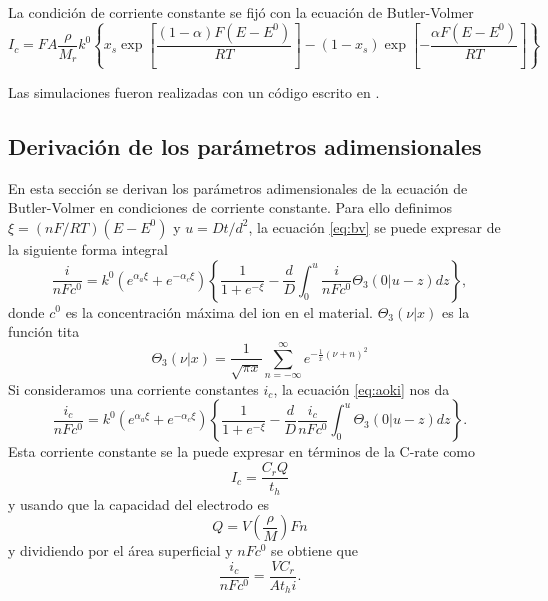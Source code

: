 La condición de corriente constante se fijó con la ecuación de Butler-Volmer
\begin{equation}\label{eq:bv}
    I_c = F A \frac{\rho}{M_r} k^0 \left\{x_s \exp\left[ \frac{(1-\alpha)F(E-E^0)}{RT} \right] - (1 - x_s) \exp\left[ -\frac{\alpha F (E-E^0)}{RT} \right] \right\}
\end{equation}

Las simulaciones fueron realizadas con un código escrito en .


\subsection{Derivación de los parámetros adimensionales}\label{s:derivparam}

En esta sección se derivan los parámetros adimensionales de la ecuación de
Butler-Volmer en condiciones de corriente constante. Para ello definimos
$\xi = (nF/RT)(E - E^0)$ y $u = D t / d^2$, la ecuación \ref{eq:bv} se puede 
expresar de la siguiente forma integral \cite{aoki1984}
\begin{equation}\label{eq:aoki}
    \frac{i}{n F c^0} = k^0 \left(e^{\alpha_a \xi} + e^{-\alpha_c \xi}\right) \left\{ \frac{1}{1+e^{-\xi}} - \frac{d}{D} \int_0^u \frac{i}{n F c^0} \Theta_3(0|u - z) dz \right\},
\end{equation}
donde $c^0$ es la concentración máxima del ion en el material. 
$\Theta_3(\nu|x)$ es la función tita \cite{bieniasz2015}
\begin{equation}
    \Theta_3(\nu|x) = \frac{1}{\sqrt{\pi x}} \sum_{n=-\infty}^{\infty} e^{-\frac{1}{x}(\nu + n)^2}
\end{equation}
Si consideramos una corriente constantes $i_c$, la ecuación \ref{eq:aoki} nos da
\begin{equation}\label{eq:aoki2}
    \frac{i_c}{n F c^0} = k^0 \left(e^{\alpha_a \xi} + e^{-\alpha_c \xi}\right) \left\{ \frac{1}{1+e^{-\xi}} - \frac{d}{D} \frac{i_c}{n F c^0} \int_0^u \Theta_3(0|u - z) dz \right\}.
\end{equation}
Esta corriente constante se la puede expresar en términos de la C-rate como
\begin{equation}
    I_c = \frac{C_r Q}{t_h}
\end{equation}
y usando que la capacidad del electrodo es
\begin{equation}
    Q = V \left( \frac{\rho}{M} \right) F n
\end{equation}
y dividiendo por el área superficial y $n F c^0$ se obtiene que
\begin{equation}\label{eq:i_c}
    \frac{i_c}{n F c^0} = \frac{V C_r}{A t_hi}.
\end{equation}
